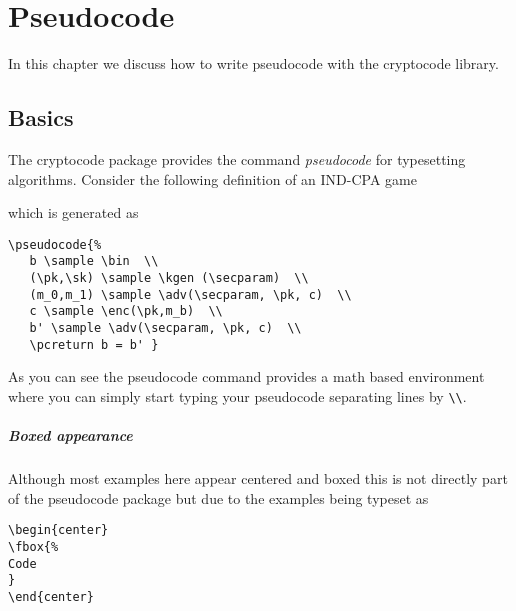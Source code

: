 \documentclass[a4paper]{report}
\begin{document}
\chapter{Pseudocode}
\label{chap:pseudocode}

In this chapter we discuss how to write pseudocode with the cryptocode library.

\section{Basics}

The cryptocode package provides the command \emph{pseudocode} for typesetting algorithms.
Consider the following definition of an IND-CPA game
\begin{center}
\end{center}
which is generated as
\begin{lstlisting}
\pseudocode{%
   b \sample \bin  \\
   (\pk,\sk) \sample \kgen (\secparam)  \\
   (m_0,m_1) \sample \adv(\secparam, \pk, c)  \\
   c \sample \enc(\pk,m_b)  \\
   b' \sample \adv(\secparam, \pk, c)  \\
   \pcreturn b = b' }
\end{lstlisting}
As you can see the pseudocode command provides a math based environment where you can simply start typing your pseudocode
separating lines by \lstinline$\\$.


\paragraph{Boxed appearance}
Although most examples here appear centered and boxed this is not directly part of the pseudocode package but due to the examples being 
typeset as
\begin{lstlisting}
\begin{center}
\fbox{%
Code
}
\end{center}
\end{lstlisting}
\end{document}
